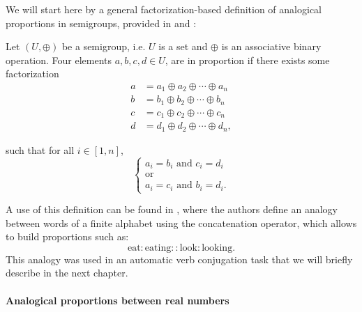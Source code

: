 We will start here by a general factorization-based definition of analogical
proportions in semigroups, provided in \cite{StrYvoCNLL05} and
\cite{StrYvoREPORT05}:

\begin{definition}
\label{DEF:proportion_semi_group}
Let $(U, \oplus)$ be a semigroup, i.e. $U$ is a set and $\oplus$ is an
  associative binary operation. Four elements $a, b, c, d \in U$, are in proportion if
  there exists some factorization
  \begin{align*}
    a &= a_1 \oplus a_2 \oplus \cdots \oplus a_n\\
    b &= b_1 \oplus b_2 \oplus \cdots \oplus b_n\\
    c &= c_1 \oplus c_2 \oplus \cdots \oplus c_n\\
    d &= d_1 \oplus d_2 \oplus \cdots \oplus d_n,
  \end{align*}

  such that for all $i \in [1, n]$,
  $$
  \begin{cases}
    a_i = b_i \text{ and } c_i = d_i\\
    \text{or}\\
    a_i = c_i \text{ and } b_i = d_i.
  \end{cases}
  $$
\end{definition}

\begin{testexample}
  A use of this definition can be found in \cite{StrYvoREPORT05}, where
  the authors define an analogy between words of a finite alphabet using the
  concatenation operator, which allows to build proportions such as:
  $$\text{eat} : \text{eating} :: \text{look} : \text{looking}.$$ This analogy
  was used in an automatic verb conjugation task that we will briefly describe
  in the next chapter.
\end{testexample}

\paragraph{Analogical proportions between real numbers\\}


